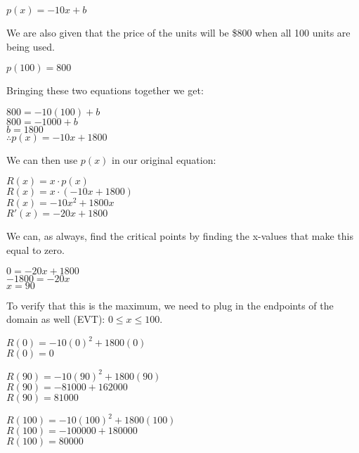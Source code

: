 \documentclass[12pt,fleqn]{book} %
\begin{document}
\begin{center}
    $p(x) = -10x + b$
\end{center}

\noindent We are also given that the price of the units will be \$800 when all 100 units are being used.

\begin{center}
    $p(100)=800$
\end{center}

\noindent Bringing these two equations together we get:

\begin{center}
    $800=-10(100)+b$ \\
    $800=-1000+b$ \\
    $b=1800$ \\
    $\therefore p(x)=-10x+1800$
\end{center}

\noindent We can then use $p(x)$ in our original equation:

\begin{center}
    $R(x) = x \cdot p(x)$ \\
    $R(x)=x \cdot (-10x+1800)$ \\
    $R(x)=-10x^2+1800x$ \\
    $R'(x)=-20x+1800$
\end{center}

\noindent We can, as always, find the critical points by finding the x-values that make this equal to zero.

\begin{center}
    $0 =-20x+1800$ \\
    $-1800=-20x$ \\
    $x=90$ \\
\end{center}

\noindent To verify that this is the maximum, we need to plug in the endpoints of the domain as well (EVT): $0\leq x \leq 100$.

\begin{multicols}{3}
    \begin{center}
        $R(0)=-10(0)^2+1800(0)$ \\
        $R(0)=0$
        \columnbreak

        $R(90)=-10(90)^2+1800(90)$ \\
        $R(90)=-81000+162000$ \\
        $R(90)=81000$
        \columnbreak

        $R(100)=-10(100)^2+1800(100)$ \\
        $R(100)=-100000+180000$ \\
        $R(100)=80000$
    \end{center}
\end{multicols}
\end{document}
